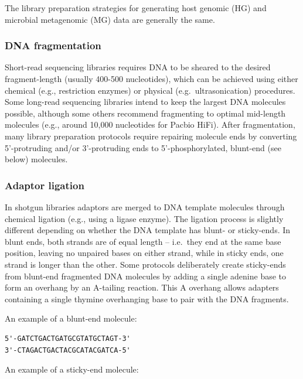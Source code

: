 \documentclass[
]{book}
\begin{document}
The library preparation strategies for generating host genomic (HG) and microbial metagenomic (MG) data are generally the same.

\hypertarget{dna-fragmentation}{%
\subsubsection*{DNA fragmentation}\label{dna-fragmentation}}

Short-read sequencing libraries requires DNA to be sheared to the desired fragment-length (usually 400-500 nucleotides), which can be achieved using either chemical (e.g., restriction enzymes) or physical (e.g.~ultrasonication) procedures. Some long-read sequencing libraries intend to keep the largest DNA molecules possible, although some others recommend fragmenting to optimal mid-length molecules (e.g., around 10,000 nucleotides for Pacbio HiFi). After fragmentation, many library preparation protocols require repairing molecule ends by converting 5'-protruding and/or 3'-protruding ends to 5'-phosphorylated, blunt-end (see below) molecules.

\hypertarget{adaptor-ligation}{%
\subsubsection*{Adaptor ligation}\label{adaptor-ligation}}

In shotgun libraries adaptors are merged to DNA template molecules through chemical ligation (e.g., using a ligase enzyme). The ligation process is slightly different depending on whether the DNA template has blunt- or sticky-ends. In blunt ends, both strands are of equal length -- i.e.~they end at the same base position, leaving no unpaired bases on either strand, while in sticky ends, one strand is longer than the other. Some protocols deliberately create sticky-ends from blunt-end fragmented DNA molecules by adding a single adenine base to form an overhang by an A-tailing reaction. This A overhang allows adapters containing a single thymine overhanging base to pair with the DNA fragments.

An example of a blunt-end molecule:

\begin{verbatim}
5'-GATCTGACTGATGCGTATGCTAGT-3'
3'-CTAGACTGACTACGCATACGATCA-5'
\end{verbatim}

An example of a sticky-end molecule:
\end{document}
